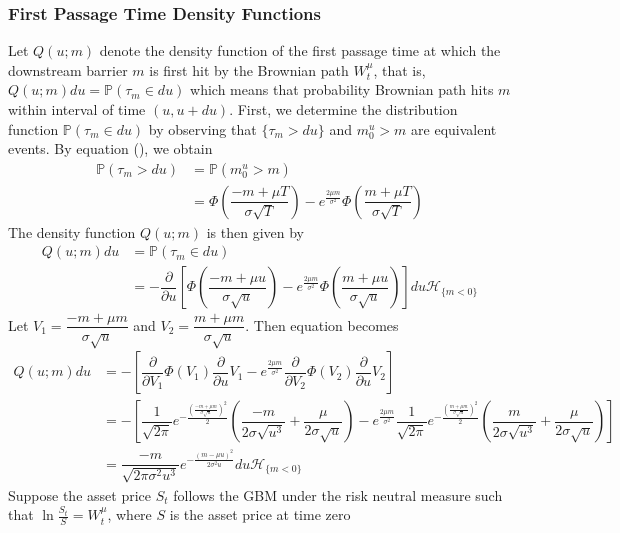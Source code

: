 \subsubsection*{First Passage Time Density Functions}
Let $Q(u; m)$ denote the density function of the first passage time at which the downstream
barrier $m$ is first hit by the Brownian path $W^\mu_t$, that is, $Q(u; m)du=\mathbb{P}(\tau_m \in du)$ which means that probability Brownian path hits $m$ within interval of time $(u, u+du)$. First, we determine the distribution function $\mathbb{P}(\tau_m \in du)$ by observing that
$\{\tau_m > du\}$ and $m^u_0>m$ are equivalent events. By equation (), we obtain
\begin{align*}
	\mathbb{P}(\tau_m > du)&=\mathbb{P}(m^u_0>m)\\
	&=\Phi\left(\dfrac{-m+\mu T}{\sigma\sqrt{T}}\right)-e^{\frac{2\mu m}{\sigma^2}}\Phi\left(\dfrac{m+\mu T}{\sigma\sqrt{T}}\right)
\end{align*}
The density function $Q(u; m)$ is then given by
\begin{align}
	Q(u; m)du&=\mathbb{P}(\tau_m \in du)\nonumber\\
	&=-\dfrac{\partial}{\partial u}\left[\Phi\left(\dfrac{-m+\mu u}{\sigma\sqrt{u}}\right)-e^{\frac{2\mu m}{\sigma^2}}\Phi\left(\dfrac{m+\mu u}{\sigma\sqrt{u}}\right)\right]du\mathcal{H}_{\{m<0\}}\label{eq422}
\end{align}
Let $V_1=\dfrac{-m+\mu m}{\sigma\sqrt{u}}$ and $V_2=\dfrac{m+\mu m}{\sigma\sqrt{u}}$. Then equation  becomes
\begin{align}
		Q(u; m)du&=-\left[\dfrac{\partial}{\partial V_1}\Phi(V_1)\dfrac{\partial}{\partial u}V_1-e^{\frac{2\mu  m}{\sigma^2}}\dfrac{\partial}{\partial V_2}\Phi(V_2)\dfrac{\partial}{\partial u}V_2\right] \nonumber \\ 
		&=-\left[\dfrac{1}{\sqrt{2\pi}}e^{-\frac{\left(\frac{-m+\mu m}{\sigma\sqrt{u}}\right)^2}{2}}\left(\dfrac{-m}{2\sigma\sqrt{u^3}}+\dfrac{\mu}{2\sigma\sqrt{u}}\right)-e^{\frac{2\mu m}{\sigma^2}}\dfrac{1}{\sqrt{2\pi}}e^{-\frac{\left(\frac{m+\mu m}{\sigma\sqrt{u}}\right)^2}{2}}\left(\dfrac{m}{2\sigma\sqrt{u^3}}+\dfrac{\mu}{2\sigma\sqrt{u}}\right)\right] \nonumber \\
		&=\dfrac{-m}{\sqrt{2\pi \sigma^2 u^3}}e^{-\frac{(m-\mu u)^2}{2\sigma^2 u}}du\mathcal{H}_{\{m<0\}} \label{eq423}
\end{align}
Suppose the asset price $S_t$ follows the GBM under the
risk neutral measure such that $\ln\frac{S_t}{S}=W^\mu_t$, 
where $S$ is the asset price at time zero

